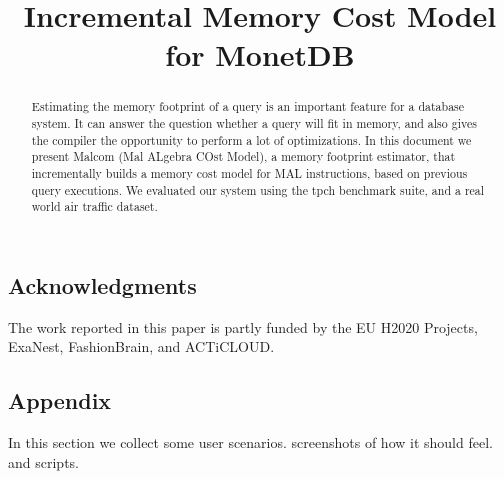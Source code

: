 \documentclass{article}
\begin{document}
\title{Incremental Memory Cost Model for MonetDB}

\maketitle

\begin{abstract}
Estimating the memory footprint of a query is an important
feature for a database system. It can answer the question whether
a query will fit in memory, and also gives the compiler the opportunity
to perform a lot of optimizations.
In this document we present Malcom (Mal ALgebra COst Model), a memory footprint
estimator, that incrementally builds a memory cost model for MAL instructions,
based on previous query executions. We evaluated our system using the tpch
benchmark suite, and a real world air traffic dataset.
\end{abstract}






\subsection*{Acknowledgments}
The work reported in this paper is partly funded by the
EU H2020 Projects, ExaNest, FashionBrain, and ACTiCLOUD.
{\small


}
\subsection*{Appendix}
In this section we collect some user scenarios. screenshots of how it should feel.
and scripts.
\end{document}
